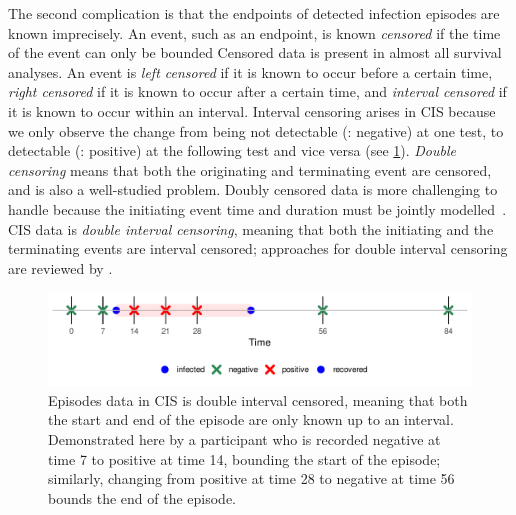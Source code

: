 \documentclass[thesis.tex]{subfiles}
\begin{document}
The second complication is that the endpoints of detected infection episodes are known imprecisely.
An event, such as an endpoint, is known \emph{censored} if the time of the event can only be bounded
Censored data is present in almost all survival analyses.
An event is \emph{left censored} if it is known to occur before a certain time, \emph{right censored} if it is known to occur after a certain time, and \emph{interval censored} if it is known to occur within an interval.
Interval censoring arises in CIS because we only observe the change from being not detectable (\ie: negative) at one test, to detectable (\ie: positive) at the following test and vice versa (see \cref{perf-test:fig:double-interval-censor}).
\emph{Double censoring} means that both the originating and terminating event are censored, and is also a well-studied problem.
Doubly censored data is more challenging to handle because the initiating event time and duration must be jointly modelled~\autocite[and references therein]{liSemiparametric}.
CIS data is \emph{double interval censoring}, meaning that both the initiating and the terminating events are interval censored; approaches for double interval censoring are reviewed by \textcite{sunAnalysis,bogaertsSurvival}.
\begin{figure}
  \centering \includegraphics{cis-perfect-testing/double-interval-censor}
  \caption[Double-interval censoring in CIS data]{Episodes data in CIS is double interval censored, meaning that both the start and end of the episode are only known up to an interval. Demonstrated here by a participant who is recorded negative at time 7 to positive at time 14, bounding the start of the episode; similarly, changing from positive at time 28 to negative at time 56 bounds the end of the episode. \label{perf-test:fig:double-interval-censor}}
\end{figure}
\end{document}
